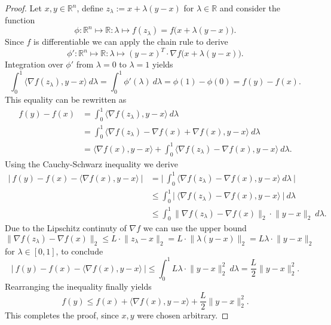 \documentclass[11pt, a4paper]{article}
\newcommand{\R}{\mathds{R}}
\begin{document}
\begin{proof}
Let $x,y \in \R^n$, define $z_{\lambda} := x + \lambda (y - x)$ for $\lambda \in \R$ and consider the function
\[ \phi : \R^n \mapsto \R : \lambda \mapsto f(z_{\lambda}) = f \big (x + \lambda (y-x) \big ). \]
Since $f$ is differentiable we can apply the chain rule to derive
\[ \phi' : \R^n \mapsto \R : \lambda \mapsto (y-x)^T \cdot \nabla f \big ( x + \lambda (y-x) \big ). \]
Integration over $\phi'$ from $\lambda = 0$ to $\lambda = 1$ yields
\[ \int_{0}^{1} \big \langle \nabla f(z_{\lambda}), y-x \big \rangle \ d\lambda = \int_{0}^{1} \phi'(\lambda) \ d \lambda = \phi(1) - \phi(0) = f(y) - f(x). \]
This equality can be rewritten as
\[ \begin{split} 
f(y) - f(x) 
&= \int_{0}^{1}\big \langle \nabla f(z_{\lambda}), y-x \big \rangle \ d\lambda \\\
&= \int_{0}^{1} \big \langle \nabla f(z_{\lambda}) - \nabla f(x) + \nabla f(x) , y-x\big \rangle \ d\lambda \\\
&= \big \langle \nabla f(x), y-x \big \rangle + \int_{0}^{1} \big \langle \nabla f(z_{\lambda}) - \nabla f(x), y-x \big \rangle \ d\lambda.
\end{split} \]
Using the Cauchy-Schwarz inequality we derive
\[ \begin{split}
\Big | \ f(y) - f(x) - \big \langle \nabla f(x), y-x \big \rangle \ \Big | 
&= \Big | \ \int_{0}^{1} \big \langle \nabla f(z_{\lambda}) - \nabla f(x), y-x \big \rangle \ d\lambda \ \Big | \\\
&\leq \int_{0}^{1} \Big | \ \big \langle \nabla f(z_{\lambda}) - \nabla f(x), y-x \big \rangle \ \Big | \ d\lambda \\\
&\leq \int_{0}^{1} \big \| \nabla f( z_{\lambda}) - \nabla f(x) \big \|_2 \cdot \big \| y-x \big \|_2 \ d\lambda.
\end{split} \]
Due to the Lipschitz continuty of $\nabla f$ we can use the upper bound 
\[ \big \| \nabla f( z_{\lambda}) - \nabla f(x) \big \|_2 \leq L \cdot \big \| z_{\lambda} - x \big \|_2 = L \cdot \big \| \lambda(y-x) \big \|_2 = L\lambda \cdot \big \| y-x \big \|_2 \]
for $\lambda \in [0,1]$, to conclude
\[ \Big | \ f(y) - f(x) - \big \langle \nabla f(x), y-x \big \rangle \ \Big | \leq \int_{0}^{1} L\lambda \cdot \big \| y-x \big \|_2^2 \ d\lambda = \frac{L}{2} \big \| y-x \big \|_2^2. \]
Rearranging the inequality finally yields
\[ f(y) \leq f(x) + \big \langle \nabla f(x) , y -x \big \rangle + \frac{L}{2} \big \| y - x \big \|_2^2. \]
This completes the proof, since $x,y$ were chosen arbitrary.
\end{proof}
\end{document}
